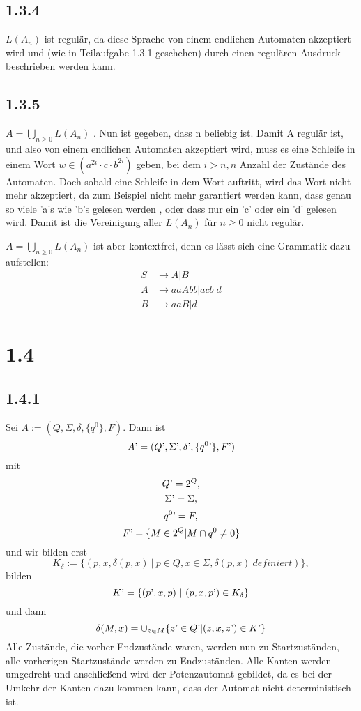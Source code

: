 \documentclass{article}
\begin{document}
\subsection*{1.3.4}

$L(A_n)$ ist regulär, da diese Sprache von einem endlichen Automaten akzeptiert
wird und (wie in Teilaufgabe 1.3.1 geschehen) durch einen regulären Ausdruck
beschrieben werden kann.

\subsection*{1.3.5}
 
$A = \bigcup_{n \geq 0} L(A_n)$ . Nun ist gegeben, dass n beliebig ist. Damit A
regulär ist, und also von einem endlichen Automaten akzeptiert wird, muss es
eine Schleife in einem Wort $w \in (a^{2i}\cdot c\cdot b^{2i})$ geben, bei dem
$i > n, n$ Anzahl der Zustände des Automaten. Doch sobald eine Schleife in dem
Wort auftritt, wird das Wort nicht mehr akzeptiert, da zum Beispiel nicht mehr
garantiert werden kann, dass genau so viele 'a's wie 'b's gelesen werden , oder
dass nur ein 'c' oder ein 'd' gelesen wird. Damit ist die Vereinigung aller
$L(A_n)$ für $n \geq 0$ nicht regulär. 

$A = \bigcup_{n \geq 0} L(A_n)$ ist aber kontextfrei, denn es lässt sich eine
Grammatik dazu aufstellen: \begin{align*} S &\rightarrow A | B \\ A &\rightarrow
aaAbb | acb | d \\ B &\rightarrow aaB | d \end{align*}
 
\section*{1.4}
\subsection*{1.4.1}

Sei $A := (Q, \Sigma, \delta, \{q^0\}, F)$.  Dann ist \[ A\textrm' = (Q\textrm',
\Sigma\textrm', \delta\textrm', \{q^0\textrm'\},F\textrm') \] mit \[ Q\textrm' =
2^Q,\]\[ \Sigma\textrm' = \Sigma,\] \[ q^0\textrm' = F,\] \[ F\textrm' = \{M \in
2^Q | M \cap q^0 \neq 0\} \] und wir bilden erst \[K_\delta := \{ (p,x,
\delta(p,x)~|~p \in Q, x \in \Sigma, \delta(p,x)~ definiert)\},\] bilden
\[K\textrm'= \{(p\textrm',x,p)~|~ (p,x,p\textrm') \in K_\delta\}\] und dann
\[\delta(M,x)= \cup_{z\in M} \{z\textrm' \in Q\textrm' | (z,x,z\textrm') \in
K\textrm'\}\] Alle Zustände, die vorher Endzustände waren, werden nun zu
Startzuständen, alle vorherigen Startzustände werden zu Endzuständen. Alle
Kanten werden umgedreht und anschließend wird der Potenzautomat gebildet, da es
bei der Umkehr der Kanten dazu kommen kann, dass der Automat
nicht-deterministisch ist. 
  
\end{document}
